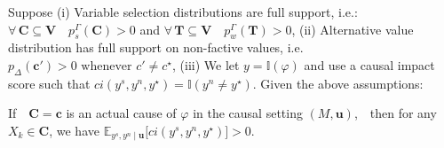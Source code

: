 \documentclass[anon,12pt]{clear2025} %
\begin{document}
\begin{theorem} \label{th:ac->positive} Suppose (i) Variable selection distributions are full support, i.e.: $\forall \,\mathbf{C} \subseteq \mathbf{V}\,\,\,\,\,\, p^\Gamma_s(\mathbf{C}) > 0$ and 
   $\forall \,\mathbf{T} \subseteq \mathbf{V}\,\,\,\,\,\,  p^\Gamma_w(\mathbf{T}) > 0$,     (ii) Alternative value distribution has full support on non-factive values, i.e. $p_\Delta(\mathbf{c}') > 0 \text{ whenever } c'\neq c^\star$, (iii) We let $y = \mathbb{I}(\varphi)$  and use a causal impact score such that  $ci(y^s, y^n, y^\star) = \mathbb{I}(y^n \neq y^\star)$. Given the above assumptions:

If \,\, \(\mathbf{C} = \mathbf{c}\) is an actual cause of \(\varphi\) in the causal setting \((M, \mathbf{u})\), \,\, then for any $X_k\in \mathbf{C}$, we have  $\mathbb{E}_{y^s, y^n \mid \mathbf{u}} \big[ ci(y^s, y^n, y^\star) \big] > 0$.
\end{theorem}
\end{document}
